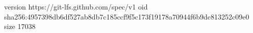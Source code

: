 version https://git-lfs.github.com/spec/v1
oid sha256:4957398db6df527ab8db7c185ccf9f5c173f19178a70944f6b9dc813252c09e0
size 17038
